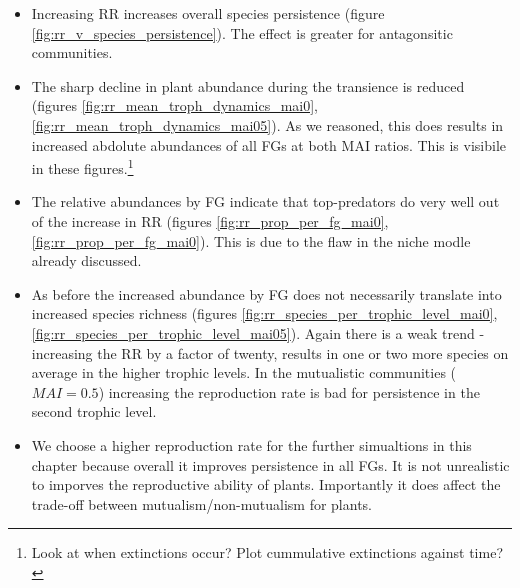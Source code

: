 \begin{itemize}
	\item Increasing RR increases overall species persistence (figure \ref{fig:rr_v_species_persistence}). The effect is greater for antagonsitic communities.

	\item The sharp decline in plant abundance during the transience is reduced (figures \ref{fig:rr_mean_troph_dynamics_mai0}, \ref{fig:rr_mean_troph_dynamics_mai05}). As we reasoned, this does results in increased abdolute abundances of all FGs at both MAI ratios. This is visibile in these figures.\footnote{Look at when extinctions occur? Plot cummulative extinctions against time?}
	
	\item The relative abundances by FG indicate that top-predators do very well out of the increase in RR (figures \ref{fig:rr_prop_per_fg_mai0}, \ref{fig:rr_prop_per_fg_mai0}). This is due to the flaw in the niche modle already discussed. 
	
	\item As before the increased abundance by FG does not necessarily translate into increased species richness (figures \ref{fig:rr_species_per_trophic_level_mai0}, \ref{fig:rr_species_per_trophic_level_mai05}). Again there is a weak trend - increasing the RR by a factor of twenty, results in one or two more species on average in the higher trophic levels. In the mutualistic communities ($MAI=0.5$) increasing the reproduction rate is bad for persistence in the second trophic level.
	
	\item We choose a higher reproduction rate for the further simualtions in this chapter because overall it improves persistence in all FGs. It is not unrealistic to imporves the reproductive ability of plants. Importantly it does affect the trade-off between mutualism/non-mutualism for plants.
	
\end{itemize}


